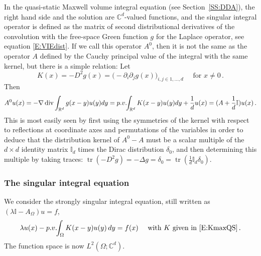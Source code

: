 \documentclass[12pt]{amsart}
\theoremstyle{definition}
\theoremstyle{remark}
\numberwithin{equation}{section}
\newcommand{\pv}{\mathop{\rm p.v.}}
\renewcommand{\div}{\operatorname{\rm div}}
\newcommand\C{{\mathbb C}}
\newcommand\R{{\mathbb R}}
\newcommand {\Id}{\mathbb I}
\begin{document}
In the quasi-static Maxwell volume integral equation (see Section~\ref{SS:DDA}), the right hand side and the solution are $\C^{d}$-valued functions, and the singular integral operator is defined as the matrix of second distributional derivatives of the convolution with the free-space Green function $g$ for the Laplace operator, see equation \eqref{E:VIEdist}. 
If we call this operator $A^{0}$, then it is not the same as the operator $A$ defined by the Cauchy principal value of the integral with the same kernel, but there is a simple relation:
Let 
\begin{equation}
\label{E:KmaxQS}
K(x)= -D^{2}g(x) = \big(-\partial_{i}\partial_{j}g(x)\big)_{i,j\in1,\dots,d} \quad\mbox{ for } x\ne0\,.
\end{equation}
Then
\begin{equation}
\label{E:D2VSPV}
A^{0}u(x) = -\nabla\div\int_{\R^{d}}g(x-y)u(y)dy =
 \pv\!\!\int_{\R^{d}} K(x-y)u(y)dy  + \frac1d u(x) =
 (A+\frac1d\Id)u(x)\,.
\end{equation}
This is most easily seen by first using the symmetries of the kernel with respect to reflections at coordinate axes and permutations of the variables in order to deduce that the distribution kernel of $A^{0}-A$ must be a scalar multiple of the $d\times d$ identity matrix 
$\Id_{d}$ times the Dirac distribution $\delta_{0}$, and then determining this multiple by taking traces:
$\mathop{\mathrm{tr}}(-D^{2}g)=-\Delta g =\delta_{0}= \mathop{\mathrm{tr}}(\frac1d \Id_{d}\delta_{0})$.

\subsubsection{The singular integral equation}\label{SSS:SIOEx5}
We consider the strongly singular integral equation, still written as 
$(\lambda \Id -A_{\Omega})u=f$,
\begin{equation}
\label{E:VIOMQS}
 \lambda u(x) - \pv\!\! \int_{\Omega}K(x-y) u(y)\,dy = f(x) \quad
 \mbox{ with } K \mbox{ given in \eqref{E:KmaxQS}}\,.
\end{equation}
The function space is now $L^{2}(\Omega;\C^{d})$.
\end{document}

